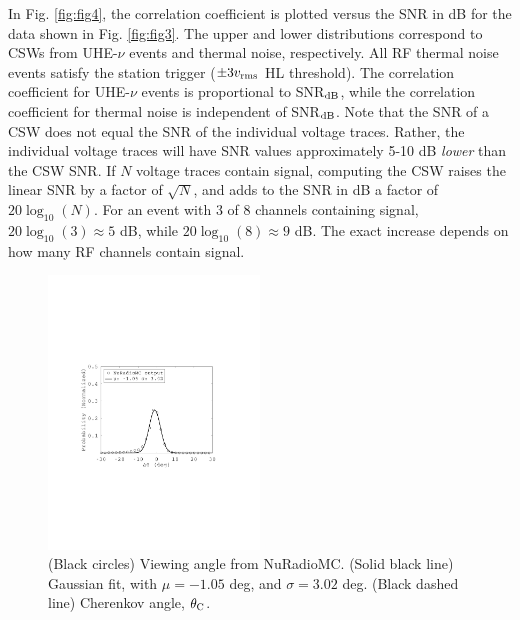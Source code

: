 \documentclass[amsmath,amssymb,aps,prd,10pt,twocolumn,showkeys]{revtex4}
\begin{document}
\begin{itemize}
In Fig. \ref{fig:fig4}, the correlation coefficient is plotted versus the SNR in dB for the data shown in Fig. \ref{fig:fig3}.  The upper and lower distributions correspond to CSWs from UHE-$\nu$ events and thermal noise, respectively.  All RF thermal noise events satisfy the station trigger ($\pm 3v_{\rm rms}$ HL threshold).  The correlation coefficient for UHE-$\nu$ events is proportional to SNR$_{\rm dB}$, while the correlation coefficient for thermal noise is independent of SNR$_{\rm dB}$.  Note that the SNR of a CSW does not equal the SNR of the individual voltage traces.  Rather, the individual voltage traces will have SNR values approximately 5-10 dB \textit{lower} than the CSW SNR.  If $N$ voltage traces contain signal, computing the CSW raises the linear SNR by a factor of $\sqrt{N}$, and adds to the SNR in dB a factor of $20\log_{10}(N)$.  For an event with 3 of 8 channels containing signal, $20\log_{10}(3)\approx 5$ dB, while $20\log_{10}(8)\approx 9$ dB.  The exact increase depends on how many RF channels contain signal.

\begin{figure}
\centering
\includegraphics[width=0.5\textwidth,trim=3.25cm 8.25cm 4.5cm 9.0cm,clip=true]{Aug18_plot1.pdf}
\caption{\label{fig:fig5} (Black circles) Viewing angle from NuRadioMC. (Solid black line) Gaussian fit, with $\mu = -1.05$ deg, and $\sigma = 3.02$ deg.  (Black dashed line) Cherenkov angle, $\theta_{\rm C}$.}
\end{figure}


\end{itemize}
\end{document}

